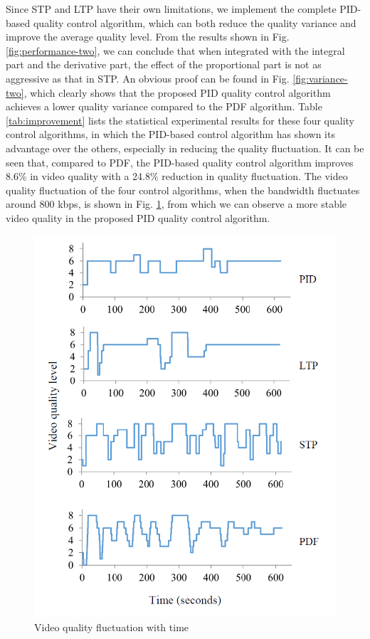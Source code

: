 \documentclass[journal,draftclsnofoot,onecolumn]{IEEEtran}
\begin{document}
Since STP and LTP have their own limitations, we implement the complete PID-based quality control algorithm, which can both reduce the quality variance and improve the average quality level. From the results shown in Fig. \ref{fig:performance-two}, we can conclude that when integrated with the integral part and the derivative part, the effect of the proportional part is not as aggressive as that in STP. An obvious proof can be found in Fig. \ref{fig:variance-two}, which clearly shows that the proposed PID quality control algorithm achieves a lower quality variance compared to the PDF algorithm. Table \ref{tab:improvement} lists the statistical experimental results for these four quality control algorithms, in which the PID-based control algorithm has shown its advantage over the others, especially in reducing the quality fluctuation. It can be seen that, compared to PDF, the PID-based quality control algorithm improves 8.6\% in video quality with a 24.8\% reduction in quality fluctuation. The video quality fluctuation of the four control algorithms, when the bandwidth fluctuates around 800 kbps, is shown in Fig. \ref{fig:fluctuation}, from which we can observe a more stable video quality in the proposed PID quality control algorithm.

\begin{figure}
\centering
\includegraphics[width = 0.8\linewidth]{Fluctuation.png}
\caption{Video quality fluctuation with time \label{fig:fluctuation}}
\end{figure}
\end{document}
